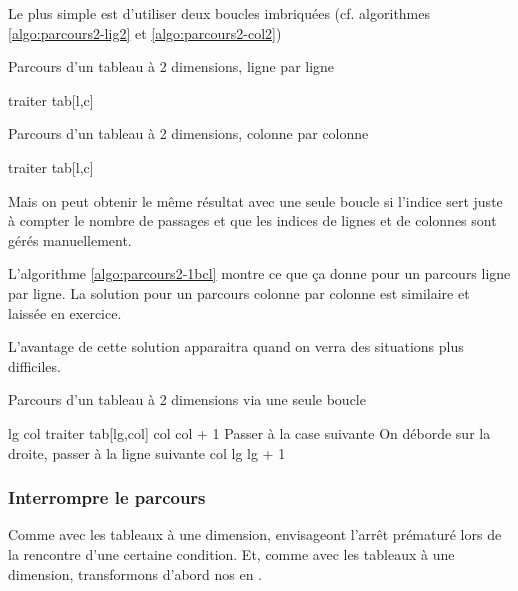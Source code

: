 Le plus simple est d'utiliser deux boucles imbriquées 
(cf. algorithmes \vref{algo:parcours2-lig2} et \vref{algo:parcours2-col2})

\begin{algorithm}[H]
\begin{pseudo}
	\caption{Parcours d'un tableau à 2 dimensions, ligne par ligne}
	\label{algo:parcours2-lig2}
			\Stmt traiter tab[l,c]
		\EndFor
	\EndFor
\end{pseudo}
\end{algorithm}

\begin{algorithm}[H]
\begin{pseudo}
	\caption{Parcours d'un tableau à 2 dimensions, colonne par colonne}
	\label{algo:parcours2-col2}
			\Stmt traiter tab[l,c]
		\EndFor
	\EndFor
\end{pseudo}
\end{algorithm}

Mais on peut obtenir le même résultat avec une seule boucle
si l'indice sert juste à compter le nombre de passages
et que les indices de lignes et de colonnes sont gérés manuellement.

L'algorithme \vref{algo:parcours2-1bcl} montre ce que ça donne
pour un parcours ligne par ligne.
La solution pour un parcours colonne par colonne est similaire
et laissée en exercice.

L'avantage de cette solution apparaitra 
quand on verra des situations plus difficiles.

\begin{algorithm}[H]
\begin{pseudo}
	\caption{Parcours d'un tableau à 2 dimensions via une seule boucle}
	\label{algo:parcours2-1bcl}
	\Let lg 
	\Let col 
		\Stmt traiter tab[lg,col]
		\Let col \Gets col + 1	\RComment Passer à la case suivante
		 \RComment On déborde sur la droite, passer à la ligne suivante
			\Let col 
			\Let lg \Gets lg + 1
		\EndIf
	\EndFor
\end{pseudo}
\end{algorithm}

\subsubsection*{Interrompre le parcours}

Comme avec les tableaux à une dimension, 
envisageont l'arrêt prématuré lors de la rencontre d'une certaine condition.
Et, comme avec les tableaux à une dimension, 
transformons d'abord nos  en .

